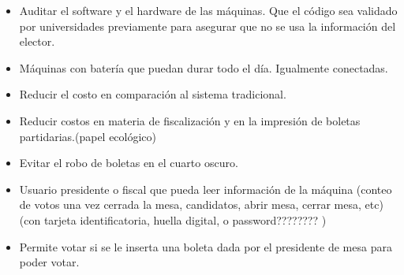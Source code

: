 \documentclass[spanish, 10pt,a4paper]{article}
\numberwithin{equation}{section} %
\begin{document}
\begin{itemize}
\item Auditar el software y el hardware de las máquinas. Que el código sea validado por universidades previamente para asegurar que no se usa la información del elector.
\item Máquinas con batería que puedan durar todo el día. Igualmente conectadas.
\item Reducir el costo en comparación al sistema tradicional. 
\item Reducir costos en materia de fiscalización y en la impresión de boletas partidarias.(papel ecológico)
\item Evitar el robo de boletas en el cuarto oscuro. 
\item Usuario presidente o fiscal que pueda leer información de la máquina (conteo de votos una vez cerrada la mesa, candidatos, abrir mesa, cerrar mesa, etc) (con tarjeta identificatoria, huella digital,  o password???????? ) 
\item Permite votar si se le inserta una boleta dada por el presidente de mesa para poder votar. 
\end{itemize}
\end{document}
